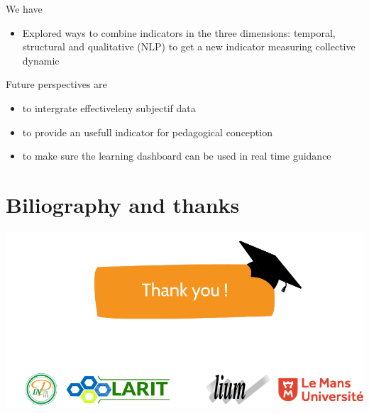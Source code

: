 \documentclass{beamer}
\begin{document}
\begin{frame}{We have}
  \begin{itemize}
  \item Explored ways to combine indicators in the three dimensions: temporal, structural and qualitative (NLP) to get a new indicator measuring collective dynamic
  \end{itemize}
  
  \begin{block}{Future perspectives are}
    \begin{itemize}
    \item to intergrate effectiveleny subjectif data
    \item to provide an usefull indicator for pedagogical conception
    \item to make sure the learning dashboard can be used in real time guidance
    \end{itemize}
  \end{block}
\end{frame}

\section{Biliography and thanks}
\begin{frame}[allowframebreaks]
  \Large {}
  \includegraphics[width=\textwidth]{./Images/thanks}
\end{frame}
\end{document}

